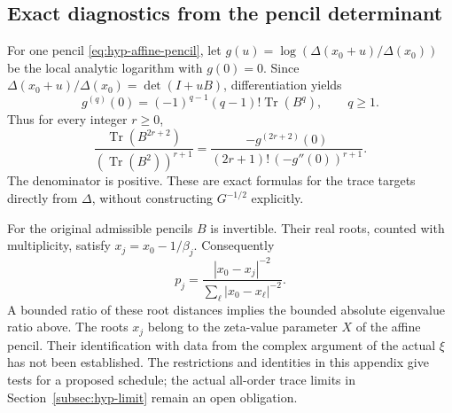\documentclass[11pt,a4paper]{article}
\numberwithin{equation}{section}
\theoremstyle{definition}
\theoremstyle{remark}
\DeclareMathOperator{\Tr}{Tr}
\begin{document}
\subsection*{Exact diagnostics from the pencil determinant}

For one pencil \eqref{eq:hyp-affine-pencil}, let
$g(u)=\log(\Delta(x_0+u)/\Delta(x_0))$ be the local analytic
logarithm with $g(0)=0$. Since
$\Delta(x_0+u)/\Delta(x_0)=\det(I+uB)$, differentiation yields
\begin{equation}\label{can-pencil-log-traces}
g^{(q)}(0)=(-1)^{q-1}(q-1)!\Tr(B^q),\qquad q\geq1.
\end{equation}
Thus for every integer $r\geq0$,
\begin{equation}\label{can-pencil-even-traces}
\frac{\Tr(B^{2r+2})}{(\Tr(B^2))^{r+1}}
=\frac{-g^{(2r+2)}(0)}
{(2r+1)!\,(-g''(0))^{r+1}}.
\end{equation}
The denominator is positive. These are exact formulas for the
trace targets directly from $\Delta$, without constructing
$G^{-1/2}$ explicitly.

For the original admissible pencils $B$ is invertible. Their real
roots, counted with multiplicity, satisfy $x_j=x_0-1/\beta_j$.
Consequently
\begin{equation}\label{can-pencil-root-weights}
p_j=\frac{|x_0-x_j|^{-2}}{\sum_\ell|x_0-x_\ell|^{-2}}.
\end{equation}
A bounded ratio of these root distances implies the bounded
absolute eigenvalue ratio above. The roots $x_j$ belong to the
zeta-value parameter $X$ of the affine pencil. Their identification
with data from the complex argument of the actual $\xi$ has not
been established. The restrictions and identities in this appendix
give tests for a proposed schedule; the actual all-order trace
limits in Section~\ref{subsec:hyp-limit} remain an open obligation.
\end{document}
